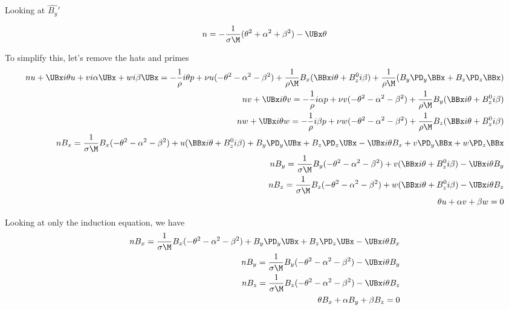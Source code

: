 \documentclass[11pt]{article}
\begin{document}
Looking at $\hat{B_y}'$

\begin{equation}\begin{aligned}
n = -\frac{1}{\sigma \M} (\theta^2 +\alpha^2 +\beta^2) - \UBx \theta \\
\end{aligned} \end{equation}


To simplify this, let's remove the hats and primes
\begin{equation}\begin{aligned}
n u+ \UBx i\theta u + v i \alpha \UBx + w i \beta \UBx = -\frac{1}{\rho} i \theta p+ \nu u (-\theta^2 -\alpha^2 - \beta^2) + \frac{1}{\rho \M} B_x (\BBx i\theta + B_z^0 i\beta) + \frac{1}{\rho \M} (B_y \PD_y \BBx + B_z \PD_z \BBx) \\
n v+ \UBx i\theta v                                    = -\frac{1}{\rho} i \alpha p+ \nu v (-\theta^2 -\alpha^2 - \beta^2) + \frac{1}{\rho \M} B_y (\BBx i\theta + B_z^0 i\beta) \\
n w+ \UBx i\theta w                                    = -\frac{1}{\rho} i \beta  p+ \nu w (-\theta^2 -\alpha^2 - \beta^2) + \frac{1}{\rho \M} B_z (\BBx i\theta + B_z^0 i\beta) \\
n B_x = \frac{1}{\sigma \M} B_x (-\theta^2 -\alpha^2 -\beta^2) + u (\BBx i\theta +B_z^0 i\beta) +B_y \PD_y \UBx +B_z \PD_z \UBx - \UBx i\theta B_x + v \PD_y \BBx +w \PD_z \BBx \\
n B_y = \frac{1}{\sigma \M} B_y (-\theta^2 -\alpha^2 -\beta^2) + v (\BBx i\theta +B_z^0 i\beta)                                 - \UBx i\theta B_y                                         \\
n B_z = \frac{1}{\sigma \M} B_z (-\theta^2 -\alpha^2 -\beta^2) + w (\BBx i\theta +B_z^0 i\beta)                                 - \UBx i\theta B_z                                         \\
\theta u +  \alpha v +  \beta w = 0 \\
\end{aligned} \end{equation}

Looking at only the induction equation, we have
\begin{equation}\begin{aligned}
n B_x = \frac{1}{\sigma \M} B_x (-\theta^2 -\alpha^2 -\beta^2) +B_y \PD_y \UBx +B_z \PD_z \UBx - \UBx i\theta B_x \\
n B_y = \frac{1}{\sigma \M} B_y (-\theta^2 -\alpha^2 -\beta^2)                                 - \UBx i\theta B_y \\
n B_z = \frac{1}{\sigma \M} B_z (-\theta^2 -\alpha^2 -\beta^2)                                 - \UBx i\theta B_z \\
\theta B_x +  \alpha B_y +  \beta B_z = 0 \\
\end{aligned} \end{equation}
\end{document}
